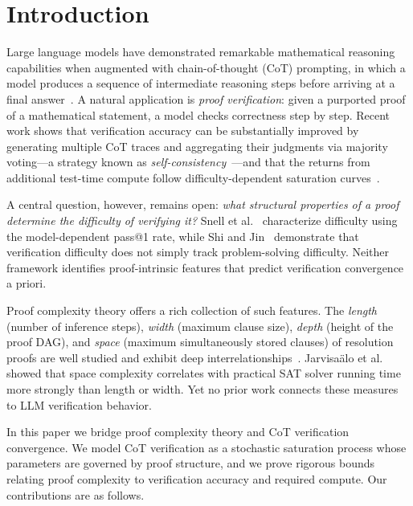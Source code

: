 \section{Introduction}\label{sec:intro}

Large language models have demonstrated remarkable mathematical reasoning
capabilities when augmented with chain-of-thought (CoT) prompting, in which a
model produces a sequence of intermediate reasoning steps before arriving at a
final answer~\cite{wei2022chain}.  A natural application is \emph{proof
verification}: given a purported proof of a mathematical statement, a model
checks correctness step by step.  Recent work shows that verification accuracy
can be substantially improved by generating multiple CoT traces and aggregating
their judgments via majority voting---a strategy known as
\emph{self-consistency}~\cite{wang2022self}---and that the returns from
additional test-time compute follow difficulty-dependent saturation
curves~\cite{snell2024scaling, shi2025heimdall}.

A central question, however, remains open: \emph{what structural properties of
a proof determine the difficulty of verifying it?}  Snell et
al.~\cite{snell2024scaling} characterize difficulty using the model-dependent
pass@1 rate, while Shi and Jin~\cite{shi2025heimdall} demonstrate that
verification difficulty does not simply track problem-solving difficulty.
Neither framework identifies proof-intrinsic features that predict verification
convergence a priori.

Proof complexity theory offers a rich collection of such features.  The
\emph{length} (number of inference steps), \emph{width} (maximum clause size),
\emph{depth} (height of the proof DAG), and \emph{space} (maximum
simultaneously stored clauses) of resolution proofs are well studied and
exhibit deep interrelationships~\cite{bensasson2001short, haken1985intractability}.
Jarvisa\"alo et al.~\cite{jarvisalo2012relating} showed that space complexity
correlates with practical SAT solver running time more strongly than length or
width.  Yet no prior work connects these measures to LLM verification behavior.

In this paper we bridge proof complexity theory and CoT verification
convergence.  We model CoT verification as a stochastic saturation process
whose parameters are governed by proof structure, and we prove rigorous bounds
relating proof complexity to verification accuracy and required compute.  Our
contributions are as follows.

